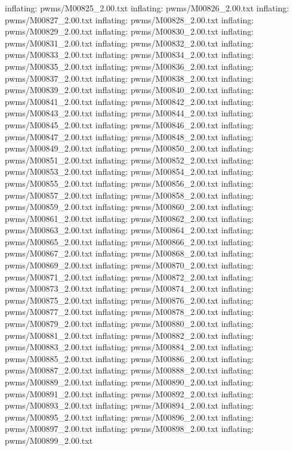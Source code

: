 \documentclass[letterpaper,10pt,english]{sphinxmanual}
\begin{document}
{\begin{sphinxVerbatim}[commandchars=\\\{\}]
  inflating: pwms/M00825\_2.00.txt
  inflating: pwms/M00826\_2.00.txt
  inflating: pwms/M00827\_2.00.txt
  inflating: pwms/M00828\_2.00.txt
  inflating: pwms/M00829\_2.00.txt
  inflating: pwms/M00830\_2.00.txt
  inflating: pwms/M00831\_2.00.txt
  inflating: pwms/M00832\_2.00.txt
  inflating: pwms/M00833\_2.00.txt
  inflating: pwms/M00834\_2.00.txt
  inflating: pwms/M00835\_2.00.txt
  inflating: pwms/M00836\_2.00.txt
  inflating: pwms/M00837\_2.00.txt
  inflating: pwms/M00838\_2.00.txt
  inflating: pwms/M00839\_2.00.txt
  inflating: pwms/M00840\_2.00.txt
  inflating: pwms/M00841\_2.00.txt
  inflating: pwms/M00842\_2.00.txt
  inflating: pwms/M00843\_2.00.txt
  inflating: pwms/M00844\_2.00.txt
  inflating: pwms/M00845\_2.00.txt
  inflating: pwms/M00846\_2.00.txt
  inflating: pwms/M00847\_2.00.txt
  inflating: pwms/M00848\_2.00.txt
  inflating: pwms/M00849\_2.00.txt
  inflating: pwms/M00850\_2.00.txt
  inflating: pwms/M00851\_2.00.txt
  inflating: pwms/M00852\_2.00.txt
  inflating: pwms/M00853\_2.00.txt
  inflating: pwms/M00854\_2.00.txt
  inflating: pwms/M00855\_2.00.txt
  inflating: pwms/M00856\_2.00.txt
  inflating: pwms/M00857\_2.00.txt
  inflating: pwms/M00858\_2.00.txt
  inflating: pwms/M00859\_2.00.txt
  inflating: pwms/M00860\_2.00.txt
  inflating: pwms/M00861\_2.00.txt
  inflating: pwms/M00862\_2.00.txt
  inflating: pwms/M00863\_2.00.txt
  inflating: pwms/M00864\_2.00.txt
  inflating: pwms/M00865\_2.00.txt
  inflating: pwms/M00866\_2.00.txt
  inflating: pwms/M00867\_2.00.txt
  inflating: pwms/M00868\_2.00.txt
  inflating: pwms/M00869\_2.00.txt
  inflating: pwms/M00870\_2.00.txt
  inflating: pwms/M00871\_2.00.txt
  inflating: pwms/M00872\_2.00.txt
  inflating: pwms/M00873\_2.00.txt
  inflating: pwms/M00874\_2.00.txt
  inflating: pwms/M00875\_2.00.txt
  inflating: pwms/M00876\_2.00.txt
  inflating: pwms/M00877\_2.00.txt
  inflating: pwms/M00878\_2.00.txt
  inflating: pwms/M00879\_2.00.txt
  inflating: pwms/M00880\_2.00.txt
  inflating: pwms/M00881\_2.00.txt
  inflating: pwms/M00882\_2.00.txt
  inflating: pwms/M00883\_2.00.txt
  inflating: pwms/M00884\_2.00.txt
  inflating: pwms/M00885\_2.00.txt
  inflating: pwms/M00886\_2.00.txt
  inflating: pwms/M00887\_2.00.txt
  inflating: pwms/M00888\_2.00.txt
  inflating: pwms/M00889\_2.00.txt
  inflating: pwms/M00890\_2.00.txt
  inflating: pwms/M00891\_2.00.txt
  inflating: pwms/M00892\_2.00.txt
  inflating: pwms/M00893\_2.00.txt
  inflating: pwms/M00894\_2.00.txt
  inflating: pwms/M00895\_2.00.txt
  inflating: pwms/M00896\_2.00.txt
  inflating: pwms/M00897\_2.00.txt
  inflating: pwms/M00898\_2.00.txt
  inflating: pwms/M00899\_2.00.txt

\end{sphinxVerbatim}}
\end{document}
